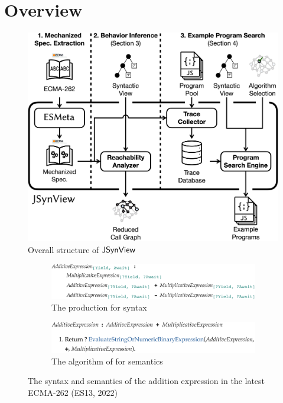 \section{Overview}\label{sec:overview}

\begin{figure}
  \centering
  \includegraphics[width=\columnwidth]{img/overall.png}
  \caption{Overall structure of $\tool$}
  \label{fig:overall}
\end{figure}

\begin{figure}
  \centering
  \begin{subfigure}[t]{\columnwidth}
    \centering
    \includegraphics[width=\columnwidth]{img/add-eval-bnf.png}
    \caption{The  production for syntax}
  \end{subfigure}
  \begin{subfigure}[t]{\columnwidth}
    \centering
    \includegraphics[width=\columnwidth]{img/add-eval-algo.png}
    \caption{The  algorithm of for semantics}
  \end{subfigure}
  \caption{The syntax and semantics of the addition expression in the latest
  ECMA-262 (ES13, 2022)}
  \label{fig:add-eval}
\end{figure}

